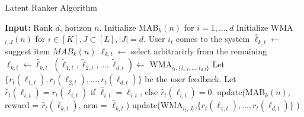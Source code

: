 

\begin{algorithm}
\caption{Latent Ranker Algorithm}
\label{alg:latent-rank}
  \begin{algorithmic}[1]
  \State \textbf{Input:} Rank $d$, horizon $n$.
  \State Initialize MAB$_k(n)$ for $i=1,...,d$
  \State Initialize WMA$_{i,J}(n)$ for $i \in [K], J \subset [L], |J| = d.$
      \State User $i_t$ comes to the system
      \State $\hat{{\ell}}_{k,t} \leftarrow$ suggest item $MAB_k(n)$
      \State ${\ell}_{k,t} \leftarrow$ select arbitrarirly from the remaining
      \Else
      \State $\ell_{k,t} \leftarrow \hat{\ell}_{k,t}$
      \EndIf
      \EndFor
      \State $(\tilde{\ell}_{1,t},\tilde{\ell}_{2,t},\dots,\tilde{\ell}_{d,t} )\leftarrow$ WMA$_{i_t,\{ l_{1,t},...,l_{d,t} \} }$ %
      \State Let  $\{ r_{t}(\ell_{1,t}), r_{t}(\ell_{2,t}),\dots,r_{t}(\ell_{d,t}) \}$ be the user feedback.
      \State Let $\hat{r}_t(\ell_{i,t}) = r_t(\ell_{i,t})$ if $\hat{\ell}_{i,t} = \ell_{i,t}$, else $\hat{r}_t(\ell_{i,t}) = 0.$
      \State update(MAB$_{k}(n)$, reward = $\hat{r}_t(\ell_{k,t})$, arm = $\hat{\ell}_{k,t}$)
      \State update(WMA$_{i_t,J_t}$,$\{ r_t(\ell_{1,t}),...,r_t(\ell_{d,t})\}$ )
    \EndFor
  \end{algorithmic}
\end{algorithm}

